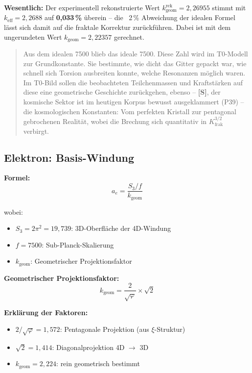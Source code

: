 	\textbf{Wesentlich:} Der experimentell rekonstruierte Wert \(k_\text{geom}^\text{rek} = 2{,}26955\) stimmt mit $k_\text{eff} = 2{,}2688$ auf \textbf{0{,}033\,\%} überein -- die ~2\,\% Abweichung der idealen Formel lässt sich damit auf die fraktale Korrektur zurückführen. Dabei ist mit dem ungerundeten Wert $k_\text{geom} = 2{,}22357$ gerechnet.
	\begin{quotation}
		Aus dem idealen 7500 blieb das ideale 7500. Diese Zahl wird im T0-Modell zur Grundkonstante. Sie bestimmte, wie dicht das Gitter gepackt war, wie schnell sich Torsion ausbreiten konnte, welche Resonanzen möglich waren.
		Im T0-Bild sollen die beobachteten Teilchenmassen und Kraftstärken auf diese eine geometrische Geschichte zurückgehen, ebenso -- \textbf{[S]}, der kosmische Sektor ist im heutigen Korpus bewusst ausgeklammert (P39) -- die kosmologischen Konstanten: Vom perfekten Kristall zur pentagonal gebrochenen Realität, wobei die Brechung sich quantitativ in $K_\text{frak}^{3/2}$ verbirgt.
	\end{quotation}
	
	\subsection{Elektron: Basis-Windung}
	
	\textbf{Formel:}
	\begin{equation}
		a_e = \frac{S_3/f}{k_{\text{geom}}}
		\label{eq:ae}
	\end{equation}
	
	wobei:
	\begin{itemize}
		\item $S_3 = 2\pi^2 = 19{,}739$: 3D-Oberfläche der 4D-Windung
		\item $f = 7500$: Sub-Planck-Skalierung
		\item $k_{\text{geom}}$: Geometrischer Projektionsfaktor
	\end{itemize}
	
	\textbf{Geometrischer Projektionsfaktor:}
	\begin{equation}
		k_{\text{geom}} = \frac{2}{\sqrt{\varphi}} \times \sqrt{2}
		\label{eq:kgeom}
	\end{equation}
	
	\textbf{Erklärung der Faktoren:}
	\begin{itemize}
		\item $2/\sqrt{\varphi} = 1{,}572$: Pentagonale Projektion (aus $\xi$-Struktur)
		\item $\sqrt{2} = 1{,}414$: Diagonalprojektion 4D $\to$ 3D
		\item $k_{\text{geom}} = 2{,}224$: rein geometrisch bestimmt
	\end{itemize}
	
